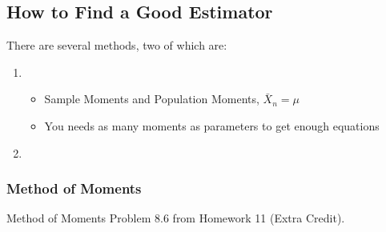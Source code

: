 	\subsection{How to Find a Good Estimator} \label{subsec:Find Good Estimator}
	There are several methods, two of which are:
		\begin{enumerate}
			\item {}
				\begin{itemize}[noitemsep, nolistsep]
					\item Sample Moments and Population Moments, $\bar{X}_{n} = \mu$
					\item You needs as many moments as parameters to get enough equations
				\end{itemize}
			\item {}
		\end{enumerate}
	
		\subsubsection{Method of Moments} \label{subsubsec:Method of Moments}
			\begin{example}{Method of Moments} 
				Problem 8.6 from Homework 11 (Extra Credit).
			\end{example}
		
